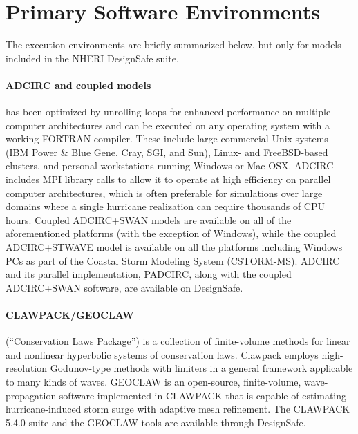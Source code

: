 \section{Primary Software Environments}
\label{sec:storm_surge_tools}

The execution environments are briefly summarized below, but only for models included in the NHERI DesignSafe suite. 

\paragraph{ADCIRC and coupled models}  has been optimized by unrolling loops for enhanced performance on multiple computer architectures and can be executed on any operating system with a working FORTRAN compiler. These include large commercial Unix systems (IBM Power \& Blue Gene, Cray, SGI, and Sun), Linux- and FreeBSD-based clusters, and personal workstations running Windows or Mac OSX. ADCIRC includes MPI library calls to allow it to operate at high efficiency on parallel computer architectures, which is often preferable for simulations over large domains where a single hurricane realization can require thousands of CPU hours. Coupled ADCIRC+SWAN models are available on all of the aforementioned platforms (with the exception of Windows), while the coupled ADCIRC+STWAVE model is available on all the platforms including Windows PCs as part of the Coastal Storm Modeling System (CSTORM-MS). ADCIRC and its parallel implementation, PADCIRC, along with the coupled ADCIRC+SWAN software, are available on DesignSafe.

\paragraph{CLAWPACK/GEOCLAW}  (``Conservation Laws Package'') is a collection of finite-volume methods for linear and nonlinear hyperbolic systems of conservation laws. Clawpack employs high-resolution Godunov-type methods with limiters in a general framework applicable to many kinds of waves. GEOCLAW is an open-source, finite-volume, wave-propagation software implemented in CLAWPACK that is capable of estimating hurricane-induced storm surge with adaptive mesh refinement. The CLAWPACK 5.4.0 suite and the GEOCLAW tools are available through DesignSafe.

